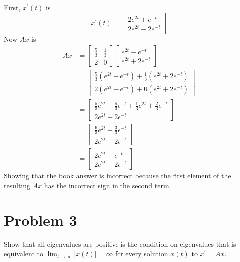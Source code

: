 \documentclass[11pt]{article}
\newenvironment{proof}{\noindent{\bf Proof.}}{\hfill $\square$\medskip}
\begin{document}
\begin{proof}
First, $x^{\prime}(t)$ is
$$x^{\prime}(t)=\begin{bmatrix}
    2e^{2t}+e^{-t}\\
    2e^{2t}-2e^{-t}
\end{bmatrix}$$
Now $Ax$ is
\begin{equation}
    \begin{split}
        Ax&=\begin{bmatrix}
            \frac{5}{3}&\frac{1}{3}\\
            2&0
        \end{bmatrix}
        \begin{bmatrix}
            e^{2t}-e^{-t}\\
            e^{2t}+2e^{-t}
        \end{bmatrix}\\
        &=\begin{bmatrix}
            \frac{5}{3}\left(e^{2t}-e^{-t}\right)+\frac{1}{3}\left(e^{2t}+2e^{-t}\right)\\
            2\left(e^{2t}-e^{-t}\right)+0\left(e^{2t}+2e^{-t}\right)
        \end{bmatrix}\\
        &=\begin{bmatrix}
            \frac{5}{3}e^{2t}-\frac{5}{3}e^{-t}+\frac{1}{3}e^{2t}+\frac{2}{3}e^{-t}\\
            2e^{2t}-2e^{-t}
        \end{bmatrix}\\
        &=\begin{bmatrix}
            \frac{6}{3}e^{2t}-\frac{3}{3}e^{-t}\\
            2e^{2t}-2e^{-t}
        \end{bmatrix}\\
        &=\begin{bmatrix}
            2e^{2t}-e^{-t}\\
            2e^{2t}-2e^{-t}
        \end{bmatrix}
    \end{split}
\end{equation}
Showing that the book answer is incorrect because the first element of the resulting $Ax$
has the incorrect sign in the second term.
\end{proof}

\section{Problem 3}
Show that all eigenvalues are positive is the condition on eigenvalues that is equivalent to
$\lim_{t\to\infty}\left|x(t)\right|=\infty$ for every solution $x(t)$ to $x^{\prime}=Ax$.
\end{document}
